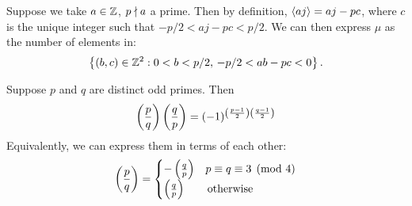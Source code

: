 \documentclass{article}
\begin{document}
Suppose we take $a \in \mathbb{Z}$, $p \nmid a$ a prime. Then by definition, $\left\langle aj \right\rangle = aj - pc$, where $c$ is the unique integer such that $-p/2 < aj - pc < p/2$. We can then express $\mu$ as the number of elements in:
\[
\left\lbrace (b, c) \in \mathbb{Z}^2 : 0 < b < p/2, \, -p/2 < ab - pc < 0 \right\rbrace.
\]

\begin{theorem}
	\label{quadratic-reciprocity}
    Suppose $p$ and $q$ are distinct odd primes. Then
    \[
	\left( \frac{p}{q} \right)\left( \frac{q}{p} \right) = (-1)^{\left( \frac{p-1}{2} \right) \left( \frac{q-1}{2} \right)}
	\]
	Equivalently, we can express them in terms of each other:
	\[
	\left( \frac{p}{q} \right) = \begin{cases}
		- \left( \frac{q}{p} \right) & p \equiv q \equiv 3 \pmod{4} \\
		\left( \frac{q}{p} \right) & \mathrel{\, \text{otherwise}}
	\end{cases}
	\]
\end{theorem}
\end{document}
